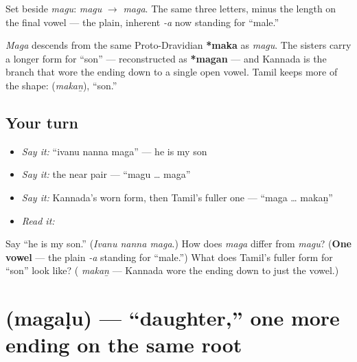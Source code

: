 Set beside \emph{magu}: \textbf{} \emph{magu} $\to$ \textbf{} \emph{maga}. The same three letters, minus the length on the final vowel — the plain, inherent \emph{-a} now standing for \textquotedblleft{}male.\textquotedblright{}

\begin{cousinweb}
\emph{Maga} descends from the same Proto-Dravidian \textbf{*maka} as \emph{magu}. The sisters carry a longer form for \textquotedblleft{}son\textquotedblright{} — reconstructed as \textbf{*magan} — and Kannada is the branch that wore the ending down to a single open vowel. Tamil keeps more of the shape: \textbf{} (\emph{makaṉ}), \textquotedblleft{}son.\textquotedblright{}
\end{cousinweb}

\subsection*{Your turn}
\begin{itemize}
\raggedright
  \item \emph{Say it:} \textquotedblleft{}ivanu nanna maga\textquotedblright{} — he is my son
  \item \emph{Say it:} the near pair — \textquotedblleft{}magu … maga\textquotedblright{}
  \item \emph{Say it:} Kannada's worn form, then Tamil's fuller one — \textquotedblleft{}maga … makaṉ\textquotedblright{}
  \item \emph{Read it:} \textbf{}
\end{itemize}

\begin{tcolorbox}[breakable,colback=teal!4,colframe=teal!35!black,title={Before you move on}]
Say \textquotedblleft{}he is my son.\textquotedblright{} (\emph{Ivanu nanna maga}.) How does \emph{maga} differ from \emph{magu}? (\textbf{One vowel} — the plain \emph{-a} standing for \textquotedblleft{}male.\textquotedblright{}) What does Tamil's fuller form for \textquotedblleft{}son\textquotedblright{} look like? (\emph{\textbf{}} \emph{makaṉ} — Kannada wore the ending down to just the vowel.)
\end{tcolorbox}
\section[\texorpdfstring{\kn{ಮಗಳು} (magaḷu)}{ಮಗಳು (magaḷu)}]{ (magaḷu) — \textquotedblleft{}daughter,\textquotedblright{} one more ending on the same root}

